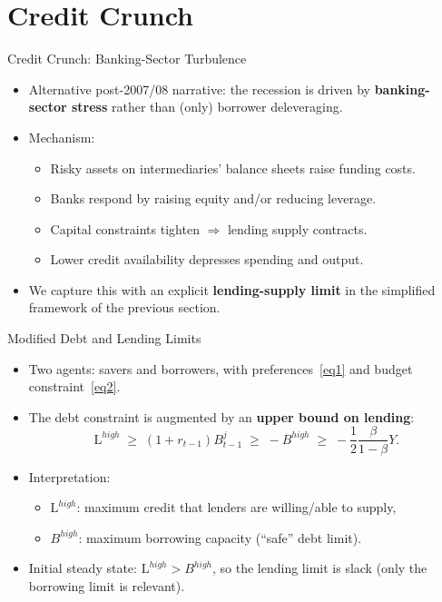 \documentclass[11pt,aspectratio=169]{beamer}
\begin{document}
\section{Credit Crunch}
\begin{frame}{Credit Crunch: Banking-Sector Turbulence}
\small
\begin{itemize}
  \item Alternative post-2007/08 narrative: the recession is driven by \textbf{banking-sector stress} rather than (only) borrower deleveraging.
  \vspace{0.3em}
  \item Mechanism:
  \begin{itemize}
    \item Risky assets on intermediaries' balance sheets raise funding costs.
    \item Banks respond by raising equity and/or reducing leverage.
    \item Capital constraints tighten $\Rightarrow$ lending supply contracts.
    \item Lower credit availability depresses spending and output.
  \end{itemize}
  \vspace{0.3em}
  \item We capture this with an explicit \textbf{lending-supply limit} in the simplified framework of the previous section.
\end{itemize}
\end{frame}

\begin{frame}{Modified Debt and Lending Limits}
\small
\begin{itemize}
  \item Two agents: savers and borrowers, with preferences~\eqref{eq1} and budget constraint~\eqref{eq2}.
  \vspace{0.3em}
  \item The debt constraint is augmented by an \textbf{upper bound on lending}:
  \begin{equation*}
    \mathrm{L}^{high}
    \;\ge\;
    (1+r_{t-1})B_{t-1}^j
    \;\ge\;
    -B^{high}
    \;\ge\;
    -\frac{1}{2}\frac{\beta}{1-\beta}Y.
  \end{equation*}
  \vspace{0.3em}
  \item Interpretation:
  \begin{itemize}
    \item $\mathrm{L}^{high}$: maximum credit that lenders are willing/able to supply,
    \item $B^{high}$: maximum borrowing capacity (``safe'' debt limit).
  \end{itemize}
  \vspace{0.3em}
  \item Initial steady state: $\mathrm{L}^{high}>B^{high}$, so the lending limit is slack (only the borrowing limit is relevant).
\end{itemize}
\end{frame}
\end{document}
